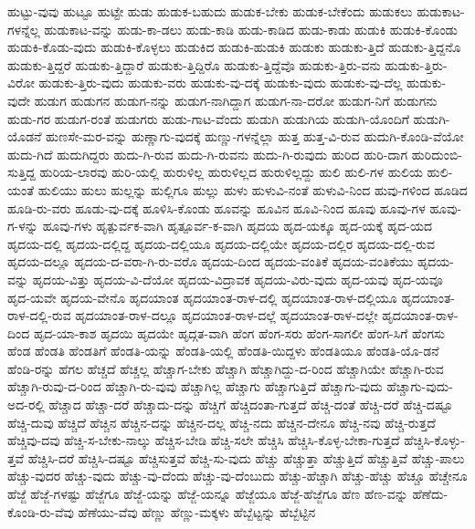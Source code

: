 {ಹುಟ್ಟು-ವುವು
ಹುಟ್ಟೂ
ಹುಟ್ಟೇ
ಹುಡು
ಹುಡುಕ-ಬಹುದು
ಹುಡುಕ-ಬೇಕು
ಹುಡುಕ-ಬೇಕೆಂದು
ಹುಡುಕಲು
ಹುಡುಕಾಟ-ಗಳನ್ನೆಲ್ಲ
ಹುಡುಕಾಟ-ವನ್ನು
ಹುಡು-ಕಾ-ಡಲು
ಹುಡು-ಕಾಡಿ
ಹುಡು-ಕಾಡಿದ
ಹುಡು-ಕಾಡು
ಹುಡುಕಿ
ಹುಡುಕಿ-ಕೊಂಡು
ಹುಡುಕಿ-ಕೊಡು-ವುದು
ಹುಡುಕಿ-ಕೊಳ್ಳಲು
ಹುಡುಕಿದ
ಹುಡುಕಿ-ಹುಡುಕಿ
ಹುಡುಕು
ಹುಡುಕು-ತ್ತಿದೆ
ಹುಡುಕು-ತ್ತಿದ್ದನೊ
ಹುಡುಕು-ತ್ತಿದ್ದರೆ
ಹುಡುಕು-ತ್ತಿದ್ದಾರೆ
ಹುಡುಕು-ತ್ತಿದ್ದಿರೊ
ಹುಡುಕು-ತ್ತಿದ್ದೆವೊ
ಹುಡುಕು-ತ್ತಿರು-ವನು
ಹುಡುಕು-ತ್ತಿರು-ವಿರೋ
ಹುಡುಕು-ತ್ತಿರು-ವುದು
ಹುಡುಕು-ವರು
ಹುಡುಕು-ವು-ದಕ್ಕೆ
ಹುಡುಕು-ವುದು
ಹುಡುಕು-ವು-ದೆಲ್ಲ
ಹುಡುಕು-ವುದೇ
ಹುಡುಗ
ಹುಡುಗನ
ಹುಡುಗ-ನನ್ನು
ಹುಡುಗ-ನಾಗಿದ್ದಾಗ
ಹುಡುಗ-ನಾ-ದರೋ
ಹುಡುಗ-ನಿಗೆ
ಹುಡುಗನು
ಹುಡು-ಗರ
ಹುಡುಗ-ರಂತೆ
ಹುಡುಗರು
ಹುಡು-ಗಾಟ-ವೆಂದು
ಹುಡುಗಿ
ಹುಡುಗಿಯ
ಹುಡುಗಿ-ಯೊಂದಿಗೆ
ಹುಡುಗಿ-ಯೊಡನೆ
ಹುಣಸೇ-ಮರ-ವನ್ನು
ಹುಣ್ಣಾಗು-ವುದಕ್ಕೆ
ಹುಣ್ಣು-ಗಳನ್ನೆಲ್ಲಾ
ಹುತ್ತ
ಹುತ್ತ-ವಿ-ರುವ
ಹುದುಗಿ-ಕೊಂಡಿ-ವೆಯೋ
ಹುದು-ಗಿದೆ
ಹುದುಗಿದ್ದರು
ಹುದು-ಗಿ-ರುವ
ಹುದು-ಗಿ-ರುವನು
ಹುದು-ಗಿ-ರುವುದು
ಹುರಿದ
ಹುರಿ-ದಾಗ
ಹುರಿದುಂಬಿ-ಸುತ್ತಿದ್ದ
ಹುರಿಯ-ಲಾರವು
ಹುರಿ-ಯಲ್ಲಿ
ಹುರುಳಿಲ್ಲ
ಹುರುಳಿಲ್ಲದ
ಹುರುಳಿಲ್ಲದ್ದು
ಹುಲಿ
ಹುಲಿ-ಗಳ
ಹುಲಿಯ
ಹುಲಿ-ಯಂತೆ
ಹುಲಿಯು
ಹುಲು
ಹುಲ್ಲನ್ನು
ಹುಲ್ಲಿಗೂ
ಹುಲ್ಲು
ಹುಳು
ಹುಳುವಿ-ನಂತೆ
ಹುಳುವಿ-ನಿಂದ
ಹುವು-ಗಳಿಂದ
ಹೂಡಿದ
ಹೂಡಿ-ರು-ವರು
ಹೂಡು-ವು-ದಕ್ಕೆ
ಹೂಳಿಸಿ-ಕೊಂಡು
ಹೂವನ್ನು
ಹೂವಿನ
ಹೂವಿ-ನಿಂದ
ಹೂವು
ಹೂವು-ಗಳ
ಹೂವು-ಗ-ಳನ್ನು
ಹೂವು-ಗಳು
ಹೃತ್ಪುರ್ವಕ-ವಾಗಿ
ಹೃತ್ಪೂರ್ವ-ಕ-ವಾಗಿ
ಹೃದಯ
ಹೃದ-ಯಕ್ಕೂ
ಹೃದ-ಯಕ್ಕೆ
ಹೃದ-ಯದ
ಹೃದಯ-ದಲ್ಲಿ
ಹೃದಯ-ದಲ್ಲಿದ್ದ
ಹೃದಯ-ದಲ್ಲಿಯೂ
ಹೃದಯ-ದಲ್ಲಿಯೇ
ಹೃದಯ-ದಲ್ಲಿರ
ಹೃದಯ-ದಲ್ಲಿ-ರುವ
ಹೃದಯ-ದಲ್ಲೂ
ಹೃದಯ-ದ-ವರಾ-ಗಿ-ರು-ವರೊ
ಹೃದಯ-ದಿಂದ
ಹೃದಯ-ವಂತಿಕೆ
ಹೃದಯ-ವಂತಿಕೆಯು
ಹೃದಯ-ವನ್ನು
ಹೃದಯ-ವಿತ್ತು
ಹೃದಯ-ವಿ-ದೆಯೋ
ಹೃದಯ-ವಿದ್ರಾವಕ
ಹೃದಯ-ವಿರು-ವುದು
ಹೃದ-ಯವು
ಹೃದ-ಯವೂ
ಹೃದ-ಯವೇ
ಹೃದಯ-ವೇನೊ
ಹೃದಯಾಂತ
ಹೃದಯಾಂತ-ರಾಳ-ದಲ್ಲಿ
ಹೃದಯಾಂತ-ರಾಳ-ದಲ್ಲಿಯೂ
ಹೃದಯಾಂತ-ರಾಳ-ದಲ್ಲಿ-ರುವ
ಹೃದಯಾಂತ-ರಾಳ-ದಲ್ಲೂ
ಹೃದಯಾಂತ-ರಾಳ-ದಲ್ಲೆ
ಹೃದಯಾಂತ-ರಾಳ-ದಲ್ಲೇ
ಹೃದಯಾಂತ-ರಾಳ-ದಿಂದ
ಹೃದ-ಯಾ-ಕಾಶ
ಹೃದಯಿ
ಹೃದಯೇ
ಹೃದ್ಗತ-ವಾಗಿ
ಹೆಂಗ
ಹೆಂಗ-ಸರು
ಹೆಂಗ-ಸಾಗಲೀ
ಹೆಂಗ-ಸಿಗೆ
ಹೆಂಗಸು
ಹೆಂಡ
ಹೆಂಡತಿ
ಹೆಂಡತಿಗೆ
ಹೆಂಡತಿ-ಯನ್ನು
ಹೆಂಡತಿ-ಯಲ್ಲಿ
ಹೆಂಡತಿ-ಯಿದ್ದಳು
ಹೆಂಡತಿಯೂ
ಹೆಂಡತಿ-ಯೊ-ಡನೆ
ಹೆಂಡಿ-ರನ್ನು
ಹೆಗಲ
ಹೆಚ್ಚದೆ
ಹೆಚ್ಚಲ್ಲ
ಹೆಚ್ಚಾಗ-ಬೇಕು
ಹೆಚ್ಚಾಗಿ
ಹೆಚ್ಚಾಗಿದ್ದು-ದ-ರಿಂದ
ಹೆಚ್ಚಾಗಿಯೇ
ಹೆಚ್ಚಾಗಿ-ರುವ
ಹೆಚ್ಚಾಗಿ-ರುವು-ದ-ರಿಂದ
ಹೆಚ್ಚಾಗಿ-ರು-ವುವು
ಹೆಚ್ಚಾಗಿಲ್ಲ
ಹೆಚ್ಚಾಗು
ಹೆಚ್ಚಾಗುತ್ತಿದೆ
ಹೆಚ್ಚಾಗು-ವುದು
ಹೆಚ್ಚಾಗು-ವುದು-ಅದ-ರಲ್ಲಿ
ಹೆಚ್ಚಾದ
ಹೆಚ್ಚಾ-ದರೆ
ಹೆಚ್ಚಾದು-ದನ್ನು
ಹೆಚ್ಚಿಗೆ
ಹೆಚ್ಚಿದಂತಾ-ಗುತ್ತದೆ
ಹೆಚ್ಚಿ-ದಂತೆ
ಹೆಚ್ಚಿ-ದರೆ
ಹೆಚ್ಚಿ-ದಷ್ಟೂ
ಹೆಚ್ಚಿ-ದುವು
ಹೆಚ್ಚಿದೆ
ಹೆಚ್ಚಿನ
ಹೆಚ್ಚಿನ-ದನ್ನು
ಹೆಚ್ಚಿನ-ದಲ್ಲ
ಹೆಚ್ಚಿ-ನದು
ಹೆಚ್ಚಿನ-ದೇನೂ
ಹೆಚ್ಚಿ-ನವು
ಹೆಚ್ಚಿ-ರುತ್ತದೆ
ಹೆಚ್ಚಿವು-ದವು
ಹೆಚ್ಚಿ-ಸ-ಬೇಕು-ನಾಲ್ಕು
ಹೆಚ್ಚಿಸ-ಬೇಡಿ
ಹೆಚ್ಚಿ-ಸಲೇ
ಹೆಚ್ಚಿಸಿ
ಹೆಚ್ಚಿಸಿ-ಕೊಳ್ಳ-ಬೇಕಾ-ಗುತ್ತದೆ
ಹೆಚ್ಚಿಸಿ-ಕೊಳ್ಳು-ತ್ತವೆ
ಹೆಚ್ಚಿಸಿ-ದರೆ
ಹೆಚ್ಚಿಸಿ-ದಷ್ಟೂ
ಹೆಚ್ಚಿಸುತ್ತವೆ
ಹೆಚ್ಚಿ-ಸು-ವುದು
ಹೆಚ್ಚು
ಹೆಚ್ಚುತ್ತಾ
ಹೆಚ್ಚುತ್ತಿದೆ
ಹೆಚ್ಚುತ್ತಿವೆ
ಹೆಚ್ಚು-ಪಾಲು
ಹೆಚ್ಚು-ವುದರ
ಹೆಚ್ಚು-ವುದು
ಹೆಚ್ಚು-ವು-ದೆಂದು
ಹೆಚ್ಚು-ವು-ದೆಂಬುದು
ಹೆಚ್ಚು-ಹೆಚ್ಚಾಗಿ
ಹೆಚ್ಚು-ಹೆಚ್ಚು
ಹೆಚ್ಚೂ
ಹೆಚ್ಚೇನೂ
ಹೆಜ್ಜೆ
ಹೆಜ್ಜೆ-ಗಳಷ್ಟು
ಹೆಜ್ಜೆಗೂ
ಹೆಜ್ಜೆ-ಯನ್ನು
ಹೆಜ್ಜೆ-ಯನ್ನೂ
ಹೆಜ್ಜೆಯೂ
ಹೆಜ್ಜೆ-ಹೆಜ್ಜೆಗೂ
ಹೆಣ
ಹೆಣ-ವನ್ನು
ಹೆಣೆದು-ಕೊಂಡಿ-ರು-ವೆವು
ಹೆಣೆಯು-ವೆವು
ಹೆಣ್ಣು
ಹೆಣ್ಣು-ಮಕ್ಕಳು
ಹೆಬ್ಬೆಟ್ಟನ್ನು
ಹೆಬ್ಬೆಟ್ಟಿನ
}
